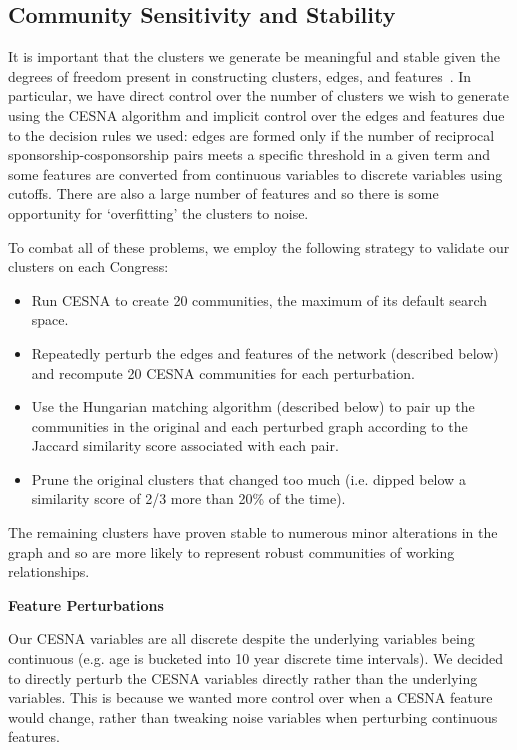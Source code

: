 \subsection{Community Sensitivity and Stability}

It is important that the clusters we generate be meaningful and stable given the
degrees of freedom present in constructing clusters, edges, and
features~\cite{Tzerpos}. In particular, we have direct control
over the number of clusters we wish to generate using the CESNA algorithm and
implicit control over the edges and features due to the decision rules we used:
edges are formed only if the number of reciprocal sponsorship-cosponsorship
pairs meets a specific threshold in a given term and some features are converted
from continuous variables to discrete variables using cutoffs. There are also a
large number of features and so there is some opportunity for `overfitting' the clusters
to noise.

To combat all of these problems, we employ the following strategy to validate our clusters on each Congress:
\begin{itemize}
	\item Run CESNA to create 20 communities, the maximum of its default search space.
	\item Repeatedly perturb the edges and features of the network (described below) and recompute 20 CESNA communities for each perturbation.
	\item Use the Hungarian matching algorithm (described below) to pair up the communities in the original and each perturbed graph according to the Jaccard similarity score associated with each pair.
	\item Prune the original clusters that changed too much (i.e. dipped below a similarity score of 2/3 more than 20\% of the time).
\end{itemize}

The remaining clusters have proven stable to numerous minor alterations in the
graph and so are more likely to represent robust communities of working
relationships.

\textbf{Feature Perturbations}

Our CESNA variables are all discrete despite the underlying variables being
continuous (e.g. age is bucketed into 10 year discrete time intervals). We
decided to directly perturb the CESNA variables directly rather than the
underlying variables. This is because we wanted more control over when a CESNA
feature would change, rather than tweaking noise variables when perturbing
continuous features.

